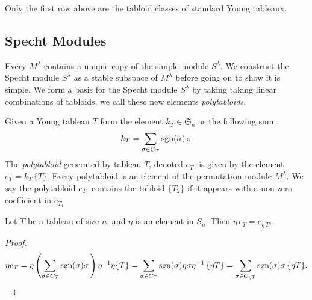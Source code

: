 \documentclass[11pt]{report}
\begin{document}
Only the first row above are the tabloid classes of standard Young 
tableaux. 

























\subsection{Specht Modules}
\label{chpt4:subsec:spechtmod}

Every $M^{\lambda}$ contains a unique copy of the simple module 
$S^{\lambda}$. We construct the Specht module $S^{\lambda}$ as a stable subspace of $M^{\lambda}$ before going on to show it is simple. We form a basis for the Specht module $S^{\lambda}$ by taking taking linear combinations of tabloids, we call these new elements \emph{polytabloids}.

\begin{defn}
	Given a Young tableau $T$ form the element $k_{T} \in \mathfrak{S}_{n}$ as the following sum:
	\begin{eqnarray}
	k_{T} = \sum_{\sigma \in C_{T}} \textnormal{sgn}(\sigma) \, \sigma \label{chpt4:eqn:polytabsumelement}
	\end{eqnarray}
	The \emph{polytabloid} generated by tableau $T$, denoted $e_{T}$, is given by the element $e_{T} = k_{T} \, \{T\}$.
	Every polytabloid is an element of the permutation module $M^{\lambda}$. We say the polytabloid $e_{T_{1}}$ contains the tabloid $\{T_{2}\}$ if it appears with a non-zero coefficient in $e_{T_{1}}$
\end{defn}

\begin{lemma}
	\label{chpt4:lem:speccyclic}
	Let $T$ be a tableau of size $n$, and $\eta$ is an element in $S_{n}$. Then 
	$\eta \, e_{T} = e_{\eta \, T}$. 
\end{lemma}	
\begin{proof}
	\begin{eqnarray*}
		\eta e_{T}  =  \eta \left(\sum_{\sigma \in C_{T}} 
		\textnormal{sgn}(\sigma)  \sigma \, \right)	\eta^{-1} \eta \{T\}
		= 
		\sum_{\sigma \in C_{T}} 
		\textnormal{sgn}(\sigma) \eta \sigma \eta^{-1} \, \{ \eta T\} = \sum_{ 
			\sigma \in C_{\eta T}} 
		\textnormal{sgn}(\sigma) \sigma\, \{ \eta T\}. \qedhere
	\end{eqnarray*}
\end{proof}
\end{document}
